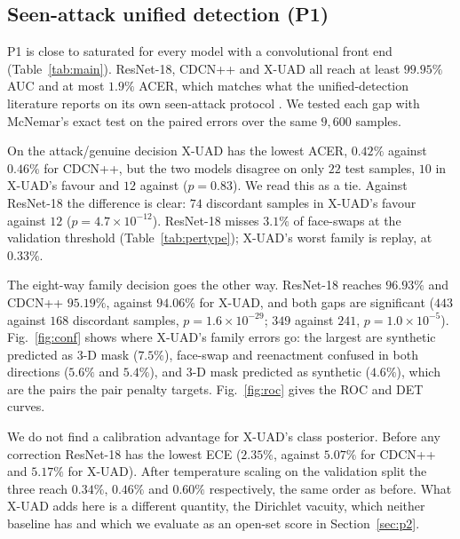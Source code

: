 \documentclass[conference]{IEEEtran}
\begin{document}
\subsection{Seen-attack unified detection (P1)}

\begin{table}[t]
\centering
\caption{Protocol P1 (seen attacks, identity-disjoint, ID-consistent), $12$-epoch
recipe, seed $0$, $9{,}600$ test samples. ACC$_8$ is eight-way family accuracy;
ECE$_{\text{TS}}$ is ECE after temperature scaling fitted on the validation split;
the other metrics follow ISO/IEC 30107-3 \cite{iso30107}. Bold marks the best of
the three detectors trained under the common recipe.
$^{\dagger}$ViT-Tiny: original $10$-epoch recipe, not retrained; its low ECE reflects
a detector operating near chance.}
\label{tab:main}
\footnotesize

\end{table}

P1 is close to saturated for every model with a convolutional front end
(Table~\ref{tab:main}). ResNet-18, CDCN++ and X-UAD all reach at least $99.95\%$
AUC and at most $1.9\%$ ACER, which matches what the unified-detection literature
reports on its own seen-attack protocol \cite{yu2024unified}. We tested each gap
with McNemar's exact test on the paired errors over the same $9{,}600$ samples.

On the attack/genuine decision X-UAD has the lowest ACER, $0.42\%$ against $0.46\%$
for CDCN++, but the two models disagree on only $22$ test samples, $10$ in X-UAD's
favour and $12$ against ($p=0.83$). We read this as a tie. Against ResNet-18 the
difference is clear: $74$ discordant samples in X-UAD's favour against $12$
($p=4.7\times10^{-12}$). ResNet-18 misses $3.1\%$ of face-swaps at the validation
threshold (Table~\ref{tab:pertype}); X-UAD's worst family is replay, at $0.33\%$.

The eight-way family decision goes the other way. ResNet-18 reaches $96.93\%$ and
CDCN++ $95.19\%$, against $94.06\%$ for X-UAD, and both gaps are significant ($443$
against $168$ discordant samples, $p=1.6\times10^{-29}$; $349$ against $241$,
$p=1.0\times10^{-5}$). Fig.~\ref{fig:conf} shows where X-UAD's family errors go:
the largest are synthetic predicted as 3-D mask ($7.5\%$),
face-swap and reenactment confused in both directions ($5.6\%$ and $5.4\%$), and
3-D mask predicted as synthetic ($4.6\%$), which are the pairs the pair penalty
targets. Fig.~\ref{fig:roc} gives the ROC and DET curves.

We do not find a calibration advantage for X-UAD's class posterior. Before any
correction ResNet-18 has the lowest ECE ($2.35\%$, against $5.07\%$ for CDCN++ and
$5.17\%$ for X-UAD). After temperature scaling on the validation split the three
reach $0.34\%$, $0.46\%$ and $0.60\%$ respectively, the same order as before. What X-UAD adds here is a different
quantity, the Dirichlet vacuity, which neither baseline has and which we evaluate
as an open-set score in Section~\ref{sec:p2}.
\end{document}
